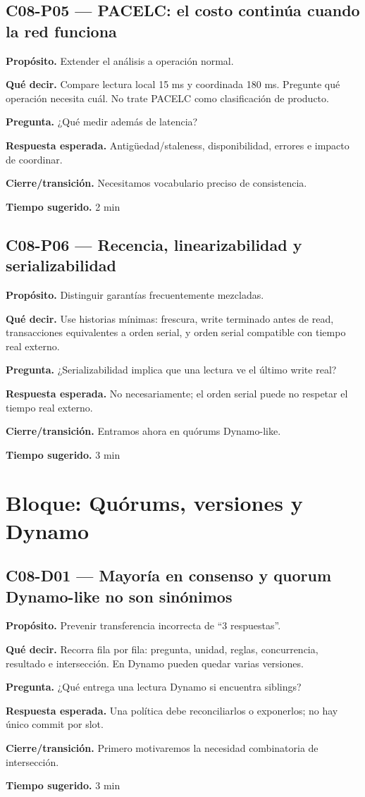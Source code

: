 \documentclass[variant=docente,cover=institutional,mode=screen]{ua-engineering-v6-article}
\newcommand{\FrameField}[2]{\par\noindent\textbf{#1.} #2\par}
\begin{document}
\subsection*{C08-P05 --- PACELC: el costo continúa cuando la red funciona}
\FrameField{Propósito}{Extender el análisis a operación normal.}
\FrameField{Qué decir}{Compare lectura local 15 ms y coordinada 180 ms. Pregunte qué operación necesita cuál. No trate PACELC como clasificación de producto.}
\FrameField{Pregunta}{¿Qué medir además de latencia?}
\FrameField{Respuesta esperada}{Antigüedad/staleness, disponibilidad, errores e impacto de coordinar.}
\FrameField{Cierre/transición}{Necesitamos vocabulario preciso de consistencia.}
\FrameField{Tiempo sugerido}{2 min}

\subsection*{C08-P06 --- Recencia, linearizabilidad y serializabilidad}
\FrameField{Propósito}{Distinguir garantías frecuentemente mezcladas.}
\FrameField{Qué decir}{Use historias mínimas: frescura, write terminado antes de read, transacciones equivalentes a orden serial, y orden serial compatible con tiempo real externo.}
\FrameField{Pregunta}{¿Serializabilidad implica que una lectura ve el último write real?}
\FrameField{Respuesta esperada}{No necesariamente; el orden serial puede no respetar el tiempo real externo.}
\FrameField{Cierre/transición}{Entramos ahora en quórums Dynamo-like.}
\FrameField{Tiempo sugerido}{3 min}

\section{Bloque: Quórums, versiones y Dynamo}

\subsection*{C08-D01 --- Mayoría en consenso y quorum Dynamo-like no son sinónimos}
\FrameField{Propósito}{Prevenir transferencia incorrecta de “3 respuestas”.}
\FrameField{Qué decir}{Recorra fila por fila: pregunta, unidad, reglas, concurrencia, resultado e intersección. En Dynamo pueden quedar varias versiones.}
\FrameField{Pregunta}{¿Qué entrega una lectura Dynamo si encuentra siblings?}
\FrameField{Respuesta esperada}{Una política debe reconciliarlos o exponerlos; no hay único commit por slot.}
\FrameField{Cierre/transición}{Primero motivaremos la necesidad combinatoria de intersección.}
\FrameField{Tiempo sugerido}{3 min}
\end{document}
